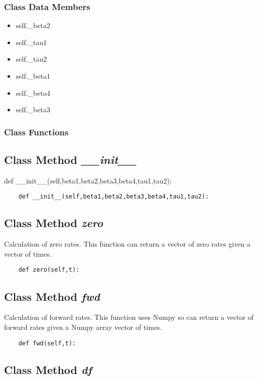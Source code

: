 \documentclass[twoside,11pt]{book}
\begin{document}
\subsubsection{Class Data Members}
\begin{itemize}
\item{self.\_beta2}
\item{self.\_tau1}
\item{self.\_tau2}
\item{self.\_beta1}
\item{self.\_beta4}
\item{self.\_beta3}
\end{itemize}

\subsubsection{Class Functions}

\subsection{Class Method {\it \_\_init\_\_}}
def \_\_init\_\_(self,beta1,beta2,beta3,beta4,tau1,tau2):

\begin{lstlisting}
    def __init__(self,beta1,beta2,beta3,beta4,tau1,tau2):
\end{lstlisting}

\subsection{Class Method {\it zero}}
Calculation of zero rates. This function can return a vector of zero rates given a vector of times. 

\begin{lstlisting}
    def zero(self,t):
\end{lstlisting}

\subsection{Class Method {\it fwd}}
Calculation of forward rates. This function uses Numpy so can return a vector of forward rates given a Numpy array vector of times. 

\begin{lstlisting}
    def fwd(self,t):
\end{lstlisting}

\subsection{Class Method {\it df}}
\end{document}
